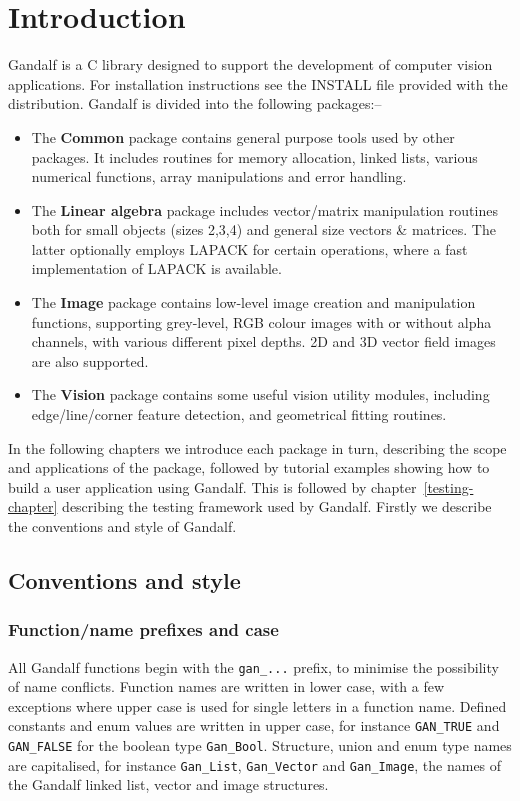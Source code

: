 \chapter{Introduction} \label{introduction-chapter}
Gandalf is a C library designed to support the development of computer
vision applications. For installation instructions see the INSTALL file
provided with the distribution. Gandalf is divided into the following
packages:--
\begin{itemize}
  \item The {\bf Common} package contains general purpose tools used by other
	packages. It includes routines for memory allocation, linked lists,
	various numerical functions, array manipulations and error handling.
  \item The {\bf Linear algebra} package includes vector/matrix manipulation
	routines both for small objects (sizes 2,3,4) and general size vectors
	\& matrices. The latter optionally employs LAPACK for certain
	operations, where a fast implementation of LAPACK is available.
  \item The {\bf Image} package contains low-level image creation and
	manipulation functions, supporting grey-level, RGB colour images with
	or without alpha channels, with various different pixel depths.
	2D and 3D vector field images are also supported.
  \item The {\bf Vision} package contains some useful vision utility modules,
	including edge/line/corner feature detection, and geometrical
	fitting routines.
\end{itemize}
In the following chapters we introduce each package in turn, describing
the scope and applications of the package, followed by tutorial examples
showing how to build a user application using Gandalf. This is followed
by chapter~\ref{testing-chapter} describing the testing framework used by
Gandalf. Firstly we describe the conventions and style of Gandalf.

\section{Conventions and style} \label{conventions-sec}
\subsection{Function/name prefixes and case}
All Gandalf functions begin with the {\tt gan\_...} prefix, to minimise the
possibility of name conflicts. Function names are written in lower case, with
a few exceptions where upper case is used for single letters
in a function name. Defined constants
and enum values are written in upper case, for instance {\tt GAN\_TRUE} and
{\tt GAN\_FALSE} for the boolean type {\tt Gan\_Bool}. Structure, union
and enum type names are capitalised, for instance {\tt Gan\_List},
{\tt Gan\_Vector} and {\tt Gan\_Image}, the names of the Gandalf linked list,
vector and image structures.

